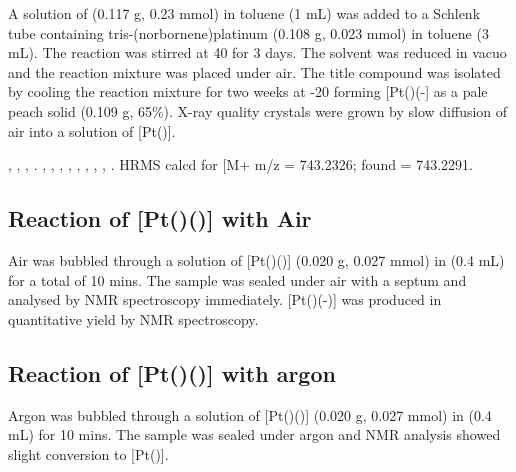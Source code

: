 A solution of \tButhixantphos{} (0.117 g, 0.23 mmol) in toluene (1 mL) was added to a Schlenk tube containing tris-(norbornene)platinum (0.108 g, 0.023 mmol) in toluene (3 mL).  The reaction was stirred at 40 \degC{} for 3 days.  The solvent was reduced in vacuo and the reaction mixture was placed under air.  The title compound was isolated by cooling the reaction mixture for two weeks at -20 \degC{} forming [Pt(\tButhixantphos)(-] as a pale peach solid (0.109 g, 65\%).  X-ray quality crystals were grown by slow diffusion of air into a  solution of [Pt(\tButhixantphos)].

,
,
,
.
,
,
,
,
,
,
,
,
.
HRMS calcd for  [M+\ce{H]+} m/z = 743.2326; found = 743.2291.

\subsection*{Reaction of \texorpdfstring{[Pt(\tButhixantphos)()]} P with Air}
Air was bubbled through a solution of [Pt(\tButhixantphos)()] (0.020 g, 0.027 mmol) in  (0.4 mL) for a total of 10 mins.  The sample was sealed under air with a septum and analysed by NMR spectroscopy immediately.  [Pt(\tButhixantphos)(-)] was produced in quantitative yield by NMR spectroscopy.  

\subsection*{Reaction of \texorpdfstring{[Pt(\tButhixantphos)()]} P with argon}
Argon was bubbled through a solution of [Pt(\tButhixantphos)()] (0.020 g, 0.027 mmol) in  (0.4 mL) for 10 mins.  The sample was sealed under argon and NMR analysis showed slight conversion to [Pt(\tButhixantphos)].  

